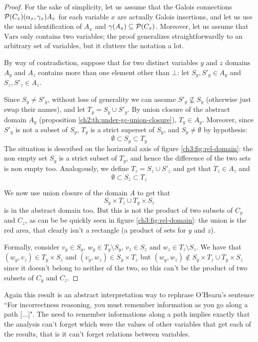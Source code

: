 \begin{proof}
	For the sake of simplicity, let us assume that the Galois connections $\mathcal{P}(C_x) (\alpha_x, \gamma_x) A_x$ for each variable $x$ are actually Galois insertions, and let us use the usual identification of $A_x$ and $\gamma(A_x) \subseteq \mathcal{P}(C_x)$.
	Moreover, let us assume that $\text{Vars}$ only contains two variables; the proof generalizes straightforwardly to an arbitrary set of variables, but it clutters the notation a lot.

	By way of contradiction, suppose that for two distinct variables $y$ and $z$ domains $A_y$ and $A_z$ contains more than one element other than $\bot$: let $S_y, S'_y \in A_y$ and $S_z, S'_z \in A_z$.

	Since $S_y \neq S'_y$, without loss of generality we can assume $S'_y \nsubseteq S_y$ (otherwise just swap their names), and let $T_y = S_y \cup S'_y$. By union closure of the abstract domain $A_y$ (proposition \ref{ch2:th:under-gc-union-closure}), $T_y \in A_y$. Moreover, since $S'_y$ is not a subset of $S_y$, $T_y$ is a strict superset of $S_y$, and $S_y \neq \emptyset$ by hypothesis:
	\[
	\emptyset \subset S_y \subset T_y
	\]
	The situation is described on the horizontal axis of figure \ref{ch3:fig:rel-domain}: the non empty set $S_y$ is a strict subset of $T_y$, and hence the difference of the two sets is non empty too.
	Analogously, we define $T_z = S_z \cup S'_z$ and get that $T_z \in A_z$ and
	\[
	\emptyset \subset S_z \subset T_z
	\]

	We now use union closure of the domain $A$ to get that
	\[
	S_y \times T_z \cup T_y \times S_z
	\]
	is in the abstract domain too. But this is not the product of two subsets of $C_y$ and $C_z$, as can be be quickly seen in figure \ref{ch3:fig:rel-domain}: the union is the red area, that clearly isn't a rectangle (a product of sets for $y$ and $z$).

	Formally, consider $v_y \in S_y$, $w_y \in T_y \setminus S_y$, $v_z \in S_z$ and $w_z \in T_z \setminus S_z$. We have that $(w_y, v_z) \in T_y \times S_z$ and $(v_y, w_z) \in S_y \times T_z$ but $(w_y, w_z) \notin S_y \times T_z \cup T_y \times S_z$ since it doesn't belong to neither of the two, so this can't be the product of two subsets of $C_y$ and $C_z$.
\end{proof}

Again this result is an abstract interpretation way to rephrase O'Hearn's sentence \cite{ohearn-incorrectness-logic} ``For incorrectness reasoning, you must remember information as you go along a path [...]".
The need to remember informations along a path implies exactly that the analysis can't forget which were the values of other variables that get each of the results, that is it can't forget relations between variables.


